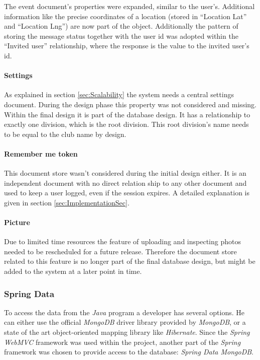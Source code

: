 The event document's properties were expanded, similar to the user's. Additional information like the precise coordinates of a location (stored in \enquote{Location Lat} and \enquote{Location Lng}) are now part of the object. Additionally the pattern of storing the message status together with the user id was adopted within the \enquote{Invited user} relationship, where the response is the value to the invited user's id.

\paragraph{Settings}

As explained in section \vref{sec:Scalability} the system needs a central settings document. During the design phase this property was not considered and missing. Within the final design it is part of the database design. It has a relationship to exactly one division, which is the root division. This root division's name needs to be equal to the club name by design. 

\paragraph{Remember me token}

This document store wasn't considered during the initial design either. It is an independent document with no direct relation ship to any other document and used to keep a user logged, even if the session expires. A detailed explanation is given in section \vref{sec:ImplementationSec}. 

\paragraph{Picture}

Due to limited time resources the feature of uploading and inspecting photos needed to be rescheduled for a future release. Therefore the document store related to this feature is no longer part of the final database design, but might be added to the system at a later point in time.

\subsubsection{Spring Data}

To access the data from the \emph{Java} program a developer has several options. He can either use the official \emph{MongoDB} driver library provided by \emph{MongoDB}, or a state of the art object-oriented mapping library like \emph{Hibernate}. Since the \emph{Spring WebMVC} framework was used within the project, another part of the \emph{Spring} framework was chosen to provide access to the database: \emph{Spring Data MongoDB}.


